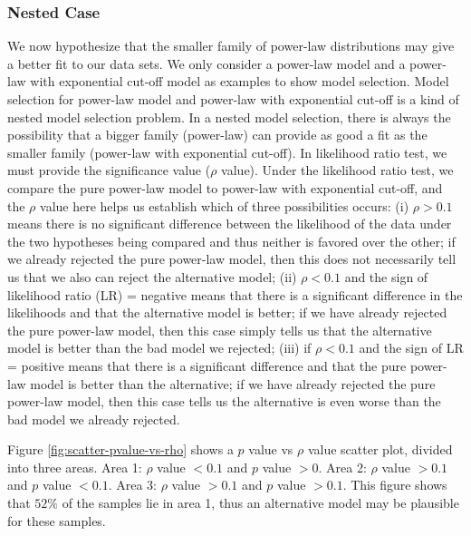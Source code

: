 \documentclass[paper]{ieice}
\begin{document}
\subsubsection{Nested Case}
We now hypothesize that the smaller family of power-law distributions may give a better fit to our data sets.
We only consider a power-law model and a power-law with exponential cut-off model as examples to show model selection.
Model selection for power-law model and power-law with exponential cut-off is a kind of nested model selection problem.
In a nested model selection,  there is always the possibility that a bigger family (power-law) can provide as good a fit as the smaller family (power-law with exponential cut-off).
In likelihood ratio test, we must provide the significance value ($\rho$ value).
Under the likelihood ratio test, we compare the pure power-law model to power-law with exponential cut-off, and the $\rho$ value here helps us establish which of three possibilities occurs: (i) $\rho > 0.1$ means there is no significant difference between the likelihood of the data under the two hypotheses being compared and thus neither is favored over the other; if we already rejected the pure power-law model, then this does not necessarily tell us that we also can reject the alternative model; (ii) $\rho  < 0.1$ and the sign of likelihood ratio (LR) = negative means that there is a significant difference in the likelihoods and that the alternative model is better; if we have already rejected the pure power-law model, then this case simply tells us that the alternative model is better than the bad model we rejected; (iii) if $\rho < 0.1$ and the sign of LR = positive means that there is a significant difference and that the pure power-law model is better than the alternative; if we have already rejected the pure power-law model, then this case tells us the alternative is even worse than the bad model we already rejected.

Figure \ref{fig:scatter-pvalue-vs-rho} shows a $p$ value vs $\rho$ value scatter plot, divided into three areas.
Area 1: $\rho$ value $<0.1$ and $p$ value $>0$. 
Area 2: $\rho$ value $>0.1$ and $p$ value $<0.1$.
Area 3: $\rho$ value $>0.1$ and  $p$ value $>0.1$. 
This figure shows that $52\%$ of the samples lie in area 1, thus an alternative model may be plausible for these samples.
\end{document}
